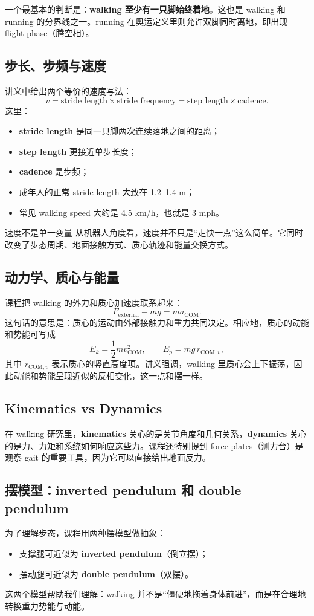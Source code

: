 \documentclass[a4paper]{article}
\begin{document}
一个最基本的判断是：\textbf{walking 至少有一只脚始终着地}。这也是 walking 和 running 的分界线之一。running 在奥运定义里则允许双脚同时离地，即出现 flight phase（腾空相）。

\subsection{步长、步频与速度}
讲义中给出两个等价的速度写法：
\[
v = \text{stride length} \times \text{stride frequency}
   = \text{step length} \times \text{cadence}.
\]
这里：
\begin{itemize}
    \item \textbf{stride length} 是同一只脚两次连续落地之间的距离；
    \item \textbf{step length} 更接近单步长度；
    \item \textbf{cadence} 是步频；
    \item 成年人的正常 stride length 大致在 1.2--1.4 m；
    \item 常见 walking speed 大约是 4.5 km/h，也就是 3 mph。
\end{itemize}

\begin{importantbox}{速度不是单一变量}
从机器人角度看，速度并不只是“走快一点”这么简单。它同时改变了步态周期、地面接触方式、质心轨迹和能量交换方式。
\end{importantbox}

\subsection{动力学、质心与能量}
课程把 walking 的外力和质心加速度联系起来：
\[
F_{\text{external}} - mg = m a_{\text{COM}}.
\]
这句话的意思是：质心的运动由外部接触力和重力共同决定。相应地，质心的动能和势能可写成
\[
E_k = \frac{1}{2} m v_{\text{COM}}^2,
 \qquad
E_p = mg\,r_{\text{COM},v},
\]
其中 \(r_{\text{COM},v}\) 表示质心的竖直高度项。讲义强调，walking 里质心会上下振荡，因此动能和势能呈现近似的反相变化，这一点和摆一样。

\subsection{Kinematics vs Dynamics}
在 walking 研究里，\textbf{kinematics} 关心的是关节角度和几何关系，\textbf{dynamics} 关心的是力、力矩和系统如何响应这些力。课程还特别提到 force plates（测力台）是观察 gait 的重要工具，因为它可以直接给出地面反力。

\subsection{摆模型：inverted pendulum 和 double pendulum}
为了理解步态，课程用两种摆模型做抽象：
\begin{itemize}
    \item 支撑腿可近似为 \textbf{inverted pendulum}（倒立摆）；
    \item 摆动腿可近似为 \textbf{double pendulum}（双摆）。
\end{itemize}
这两个模型帮助我们理解：walking 并不是“僵硬地拖着身体前进”，而是在合理地转换重力势能与动能。
\end{document}
